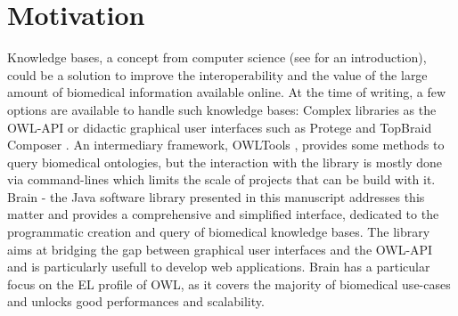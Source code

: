 \documentclass{bioinfo}
\begin{document}
\section{Motivation}
Knowledge bases, a concept from computer science (see \citealp{Krotzsch2012} for an introduction),
could be a solution to improve the interoperability and the value of the large amount of biomedical information available online.
At the time of writing, a few options are available to handle such knowledge bases: Complex
libraries as the OWL-API \citep{MatthewHorridge2011} or didactic graphical user interfaces such as
Protege \citep{StanfordCenterforBiomedicalInformaticsResearch} and TopBraid Composer \citep{TopQuadrant}. 
An intermediary framework, OWLTools \citep{MungallC},
provides some methods to query biomedical ontologies, but the interaction with the library is mostly done via command-lines which
limits the scale of projects that can be build with it.
Brain - the Java software library presented in this manuscript addresses this matter and provides a comprehensive and simplified
interface, dedicated to the programmatic creation and query of biomedical knowledge bases. The library aims at bridging the gap between
graphical user interfaces and the OWL-API and is particularly usefull to develop web applications.
Brain has a particular focus on the EL profile of OWL, as it covers the majority of biomedical
use-cases and unlocks good performances and scalability. 
\end{document}
